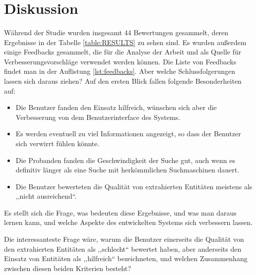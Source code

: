 \section{Diskussion}
\paragraph{}
Während der Studie wurden insgesamt 44 Bewertungen gesammelt, deren Ergebnisse in der Tabelle \ref{table:RESULTS} zu sehen sind. Es wurden außerdem einige Feedbacks gesammelt, die für die Analyse der Arbeit und als Quelle für Verbesserungsvorschläge verwendet werden können. Die Liste von Feedbacks findet man in der Auflistung \ref{lst:feedbacks}. Aber welche Schlussfolgerungen lassen sich daraus ziehen? Auf den ersten Blick fallen folgende Besonderheiten auf:
\begin{itemize}
\item Die Benutzer fanden den Einsatz hilfreich, wünschen sich aber die Verbesserung von dem Benutzerinterface des Systems.
\item Es werden eventuell zu viel Informationen angezeigt, so dass der Benutzer sich verwirrt fühlen könnte.
\item Die Probanden fanden die Geschwindigkeit der Suche gut, auch wenn es definitiv länger als eine Suche mit herkömmlichen Suchmaschinen dauert. 
\item Die Benutzer bewerteten die Qualität von extrahierten Entitäten meistens als ,,nicht ausreichend``.
\end{itemize}

Es stellt sich die Frage, was bedeuten diese Ergebnisse, und was man daraus lernen kann, und welche Aspekte des entwickelten Systems sich verbessern lassen.

Die interessanteste Frage wäre, warum die Benutzer einerseits die Qualität von den extrahierten Entitäten als ,,schlecht`` bewertet haben, aber anderseits den Einsatz von Entitäten als ,,hilfreich`` bezeichneten, und welchen Zusammenhang zwischen diesen beiden Kriterien besteht? 

